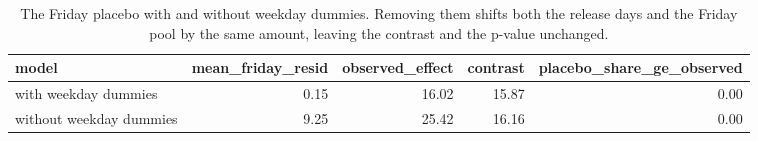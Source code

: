 \begin{table}
\caption{The Friday placebo with and without weekday dummies. Removing them shifts both the release days and the Friday pool by the same amount, leaving the contrast and the p-value unchanged.}
\begin{tabular}{lrrrr}
\toprule
model & mean\_friday\_resid & observed\_effect & contrast & placebo\_share\_ge\_observed \\
\midrule
with weekday dummies & 0.15 & 16.02 & 15.87 & 0.00 \\
without weekday dummies & 9.25 & 25.42 & 16.16 & 0.00 \\
\bottomrule
\end{tabular}
\end{table}
